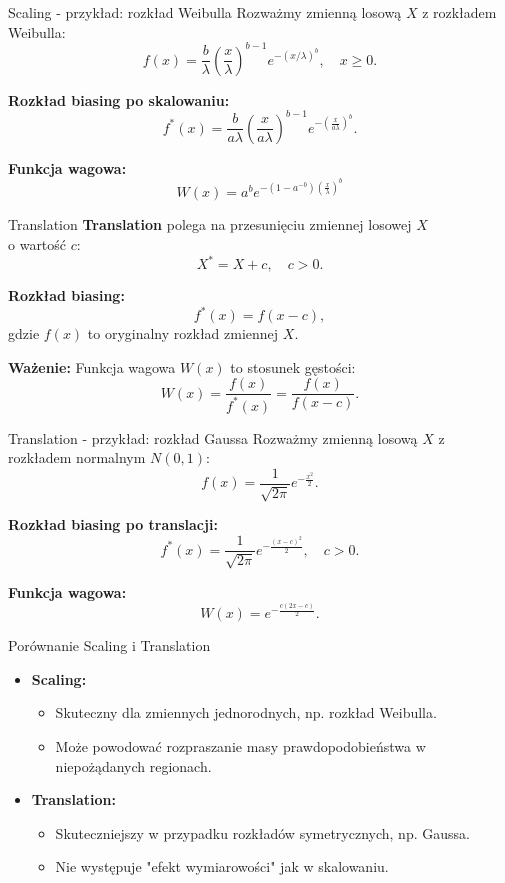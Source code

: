 \documentclass{beamer}
\begin{document}
\begin{frame}{Scaling - przykład: rozkład Weibulla}
    Rozważmy zmienną losową $X$ z rozkładem Weibulla:
    \[
    f(x) = \frac{b}{\lambda}\left(\frac{x}{\lambda}\right)^{b-1} e^{-(x/\lambda)^b}, \quad x \geq 0.
    \]

    \textbf{Rozkład biasing po skalowaniu:}
    \[
    f^*(x) = \frac{b}{a\lambda}\left(\frac{x}{a\lambda}\right)^{b-1} e^{-\left(\frac{x}{a\lambda}\right)^b}.
    \]

    \textbf{Funkcja wagowa:}
    \[
    W(x) = a^be^{-(1-a^{-b})(\frac{x}{\lambda})^b}
    \]
\end{frame}

\begin{frame}{Translation}
    \textbf{Translation} polega na przesunięciu zmiennej losowej $X$ \\ o wartość $c$:
    \[
    X^* = X + c, \quad c > 0.
    \]

    \textbf{Rozkład biasing:}
    \[
    f^*(x) = f(x - c),
    \]
    gdzie $f(x)$ to oryginalny rozkład zmiennej $X$.

    \vspace{0.5cm}
    \textbf{Ważenie:} Funkcja wagowa $W(x)$ to stosunek gęstości:
    \[
    W(x) = \frac{f(x)}{f^*(x)} = \frac{f(x)}{f(x - c)}.
    \]
\end{frame}

\begin{frame}{Translation - przykład: rozkład Gaussa}
    Rozważmy zmienną losową $X$ z rozkładem normalnym $N(0, 1)$:
    \[
    f(x) = \frac{1}{\sqrt{2\pi}} e^{-\frac{x^2}{2}}.
    \]

    \textbf{Rozkład biasing po translacji:}
    \[
    f^*(x) = \frac{1}{\sqrt{2\pi}} e^{-\frac{(x - c)^2}{2}}, \quad c > 0.
    \]

    \textbf{Funkcja wagowa:}
    \[
    W(x) = e^{-\frac{c(2x - c)}{2}}.
    \]
\end{frame}

\begin{frame}{Porównanie Scaling i Translation}
    \begin{itemize}
        \item \textbf{Scaling:}
        \begin{itemize}
            \item Skuteczny dla zmiennych jednorodnych, np. rozkład Weibulla.
            \item Może powodować rozpraszanie masy prawdopodobieństwa w niepożądanych regionach.
        \end{itemize}
        \item \textbf{Translation:}
        \begin{itemize}
            \item Skuteczniejszy w przypadku rozkładów symetrycznych, np. Gaussa.
            \item Nie występuje "efekt wymiarowości" \space jak w skalowaniu.
        \end{itemize}
    \end{itemize}
\end{frame}
\end{document}

